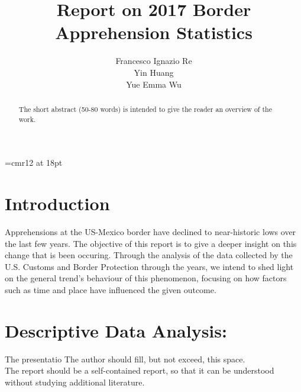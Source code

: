 \documentclass[journal, a4paper]{IEEEtran}
\begin{document}

	
\font\myfont=cmr12 at 18pt
	
	\title{ \myfont Report on 2017 Border Apprehension Statistics}
	\author{Francesco Ignazio Re\\
			Yin Huang	\\
			Yue Emma Wu
			}

	\maketitle
	
	\begin{abstract}
		The short abstract (50-80 words) is intended to give the reader an overview of the work.
	\end{abstract}
	
	\section{Introduction}
	
	Apprehensions at the US-Mexico border have declined to near-historic lows over the last few years.
	The objective of this report is to give a deeper insight on this change that is been occuring.
	Through the analysis of the data collected by the U.S. Customs and Border Protection through the years,
	we intend to shed light on the general trend's behaviour of this phenomenon, focusing on how factors such as time and place have influenced the given outcome.
	
	
	
	
	\section{Descriptive Data Analysis:}
 	The presentatio
	The author should fill, but not exceed, this space. \\
	The report should be a self-contained report, so that it can be understood without studying additional literature.
	
\end{document}
